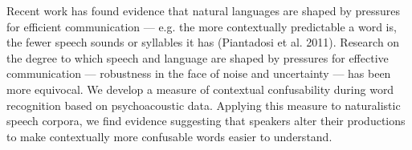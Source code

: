Recent work has found evidence that natural languages are shaped by pressures for efficient communication — e.g. the more contextually predictable a word is, the fewer speech sounds or syllables it has (Piantadosi et al. 2011). Research on the degree to which speech and language are shaped by pressures for effective communication — robustness in the face of noise and uncertainty — has been more equivocal. We develop a measure of contextual confusability during word recognition based on psychoacoustic data. Applying this measure to naturalistic speech corpora, we find evidence suggesting that speakers alter their productions to make contextually more confusable words easier to understand.
